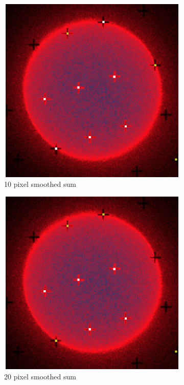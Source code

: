 \documentclass[10pt]{scrartcl}
\begin{document}
\begin{figure}[!ht]
    \hspace{-1.0in}
    \begin{subfigure}[b]{.75\linewidth}
        \centering
        \includegraphics[width=\linewidth]{../plots_tables_images/morefid.eps}
        \caption{10 pixel smoothed sum}
    \end{subfigure}
    \hspace{-1.0in}
    \begin{subfigure}[b]{.75\linewidth}
        \centering
        \includegraphics[width=\linewidth]{../plots_tables_images/lessfid.eps}
        \caption{20 pixel smoothed sum}
    \end{subfigure}
    \caption{}
    \label{smoothtest}
\end{figure}
\end{document}
